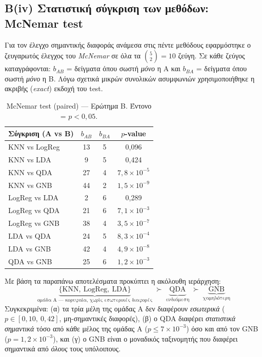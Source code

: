 \documentclass[11pt,a4paper]{article}
\begin{document}
\subsection{Β(iv) Στατιστική σύγκριση των μεθόδων: McNemar test}

Για τον έλεγχο σημαντικής διαφοράς ανάμεσα στις πέντε μεθόδους
εφαρμόστηκε ο ζευγαρωτός έλεγχος του \textit{McNemar} σε όλα τα
$\binom{5}{2} = 10$ ζεύγη. Σε κάθε ζεύγος καταγράφονται:
$b_{AB}$ = δείγματα όπου σωστή \emph{μόνο} η A και $b_{BA}$ =
δείγματα όπου σωστή \emph{μόνο} η B. Λόγω σχετικά μικρών συνολικών
ασυμφωνιών χρησιμοποιήθηκε η ακριβής (\textit{exact}) εκδοχή του
test.

\begin{table}[h!]
\centering
\caption{McNemar test (paired) — Ερώτημα Β. Έντονο = $p < 0{,}05$.}
\begin{tabular}{lccc}
\toprule
Σύγκριση (A vs B) & $b_{AB}$ & $b_{BA}$ & $p$-value \\
\midrule
KNN vs LogReg   & 13 &  5 & 0,096 \\
KNN vs LDA      &  9 &  5 & 0,424 \\
KNN vs QDA      & 27 &  4 & \textbf{$7{,}8 \times 10^{-5}$} \\
KNN vs GNB      & 44 &  2 & \textbf{$1{,}5 \times 10^{-9}$} \\
LogReg vs LDA   &  2 &  6 & 0,289 \\
LogReg vs QDA   & 21 &  6 & \textbf{$7{,}1 \times 10^{-3}$} \\
LogReg vs GNB   & 38 &  4 & \textbf{$3{,}5 \times 10^{-7}$} \\
LDA vs QDA      & 24 &  5 & \textbf{$8{,}3 \times 10^{-4}$} \\
LDA vs GNB      & 42 &  4 & \textbf{$4{,}9 \times 10^{-8}$} \\
QDA vs GNB      & 25 &  6 & \textbf{$1{,}2 \times 10^{-3}$} \\
\bottomrule
\end{tabular}
\end{table}

\noindent
Με βάση τα παραπάνω αποτελέσματα προκύπτει η ακόλουθη ιεράρχηση:
\[
\underbrace{\{\text{KNN},\ \text{LogReg},\ \text{LDA}\}}_{\text{ομάδα A — κορυφαία, χωρίς εσωτερικές διαφορές}}
\;\succ\;
\underbrace{\text{QDA}}_{\text{ενδιάμεση}}
\;\succ\;
\underbrace{\text{GNB}}_{\text{χαμηλότερη}}
\]
Συγκεκριμένα: (α) τα τρία μέλη της ομάδας A δεν διαφέρουν \emph{εσωτερικά}
($p \in [0{,}10,\ 0{,}42]$, μη-σημαντικές διαφορές), (β) ο QDA διαφέρει
\emph{στατιστικά σημαντικά} τόσο από κάθε μέλος της ομάδας A
($p \le 7 \times 10^{-3}$) όσο και από τον GNB ($p = 1{,}2 \times 10^{-3}$),
και (γ) ο GNB είναι ο μοναδικός ταξινομητής που διαφέρει σημαντικά από
\emph{όλους} τους υπόλοιπους.
\end{document}
